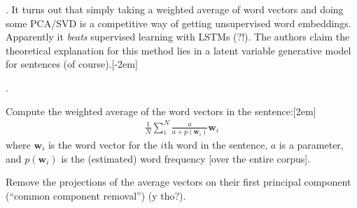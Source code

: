 \documentclass[11pt]{article}
\renewcommand\vec[2][]{\bm{#2}_{#1}}
\newcommand\myspace[1][]{\vspace{#1\bigskipamount}}
\newcommand\p{\Needspace{10\baselineskip} \noindent}
\begin{document}
\begin{comment}
		\item Short-term, it would be helpful to know, in the sense of curation paper, what makes a good conversation model on your platform? What qualities are you trying to optimize for? A model as simple as multiclass logistic regression or decision trees may do just fine for a starter model. 
		
		\item Collect data for everything you possibly can! As fine-grained as how long a user spends with the bot, the distribution of commands from user to bot, etc. If a neural net is used, save checkpoints so that transfer learning is possible.
		
		\item \green{Question}: What happens when a user issues an Agora command?
	\end{compactitem}
\end{itemize}
\end{comment}




\myspace
\p {}. It turns out that simply taking a weighted average of word vectors and doing some PCA/SVD is a competitive way of getting unsupervised word embeddings. Apparently it \textit{beats} supervised learning with LSTMs (?!). The authors claim the theoretical explanation for this method lies in a latent variable generative model for sentences (of course).[-2em]

\myspace
\p {}.
\begin{compactenum}
	\item Compute the weighted average of the word vectors in the sentence:[2em]
	\begin{align}
	\frac{1}{N} \sum_{i}^{N} \frac{a}{a + p(\vec[i]{w})} \vec[i]{w}
	\end{align}
	where $\vec[i]{w}$ is the word vector for the $i$th word in the sentence, $a$ is a parameter, and $p(\vec[i]{w})$ is the (estimated) word frequency [over the entire corpus]. 
	
	\item Remove the projections of the average vectors on their first principal component (``common component removal'') (y tho?).
\end{compactenum}
\end{document}
